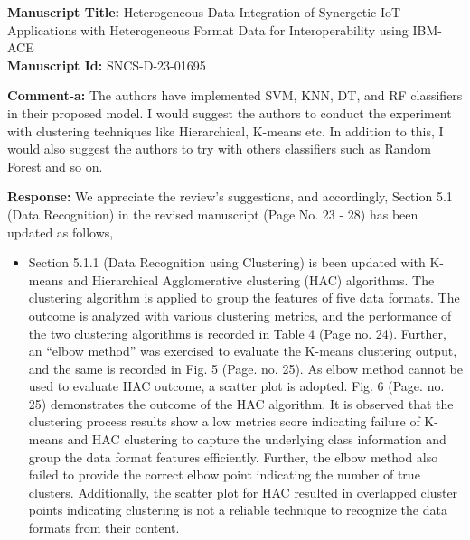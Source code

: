 \documentclass[a4paper,10pt]{article}
\begin{document}
\vspace{0.25in}

\noindent \textbf{Manuscript Title:} Heterogeneous Data Integration of Synergetic IoT Applications with Heterogeneous Format Data for Interoperability using IBM-ACE \\

\noindent \textbf{Manuscript Id:} SNCS-D-23-01695 \\


\begin{enumerate}

{\color{blue} \item \textbf{Comment-a:} The authors have implemented SVM, KNN, DT, and RF classifiers in their proposed model. I would suggest the authors to conduct the experiment with clustering techniques like Hierarchical, K-means etc.  In addition to this, I would also suggest the authors to try with others classifiers such as Random Forest and  so on.} 

\textbf{Response:} We appreciate the review's suggestions, and accordingly, Section 5.1 (Data Recognition) in the revised manuscript (Page No. 23 - 28) has been updated as follows,

\begin{itemize}
    \item Section 5.1.1 (Data Recognition using Clustering) is been updated with  K-means and Hierarchical Agglomerative clustering (HAC) algorithms. The clustering algorithm is applied to group the features of five data formats. The outcome is analyzed with various clustering metrics, and the performance of the two clustering algorithms is recorded in Table 4 (Page no. 24). Further, an ``elbow method'' was exercised to evaluate the K-means clustering output, and the same is recorded in Fig. 5 (Page. no. 25). As elbow method cannot be used to evaluate HAC outcome, a scatter plot is adopted. Fig. 6 (Page. no. 25) demonstrates the outcome of the HAC algorithm. It is observed that the clustering process results show a low metrics score indicating failure of K-means and HAC clustering to capture the underlying class information and group the data format features efficiently. Further, the elbow method also failed to provide the correct elbow point indicating the number of true clusters. Additionally, the scatter plot for HAC resulted in overlapped cluster points indicating clustering is not a reliable technique to recognize the data formats from their content. 
    

\end{itemize}
\end{enumerate}
\end{document}
